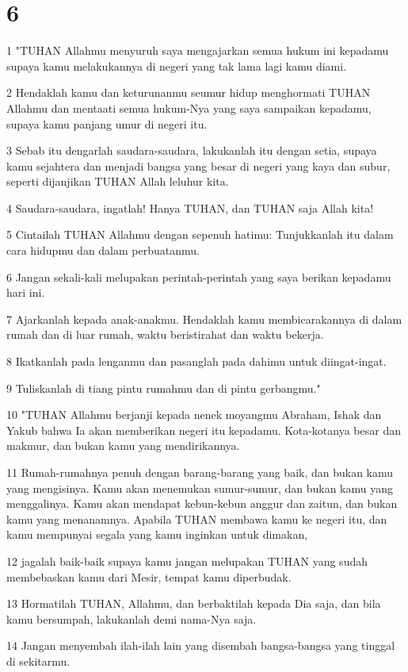 \chapter{6}

\par 1 "TUHAN Allahmu menyuruh saya mengajarkan semua hukum ini kepadamu supaya kamu melakukannya di negeri yang tak lama lagi kamu diami.
\par 2 Hendaklah kamu dan keturunanmu seumur hidup menghormati TUHAN Allahmu dan mentaati semua hukum-Nya yang saya sampaikan kepadamu, supaya kamu panjang umur di negeri itu.
\par 3 Sebab itu dengarlah saudara-saudara, lakukanlah itu dengan setia, supaya kamu sejahtera dan menjadi bangsa yang besar di negeri yang kaya dan subur, seperti dijanjikan TUHAN Allah leluhur kita.
\par 4 Saudara-saudara, ingatlah! Hanya TUHAN, dan TUHAN saja Allah kita!
\par 5 Cintailah TUHAN Allahmu dengan sepenuh hatimu: Tunjukkanlah itu dalam cara hidupmu dan dalam perbuatanmu.
\par 6 Jangan sekali-kali melupakan perintah-perintah yang saya berikan kepadamu hari ini.
\par 7 Ajarkanlah kepada anak-anakmu. Hendaklah kamu membicarakannya di dalam rumah dan di luar rumah, waktu beristirahat dan waktu bekerja.
\par 8 Ikatkanlah pada lenganmu dan pasanglah pada dahimu untuk diingat-ingat.
\par 9 Tuliskanlah di tiang pintu rumahmu dan di pintu gerbangmu."
\par 10 "TUHAN Allahmu berjanji kepada nenek moyangmu Abraham, Ishak dan Yakub bahwa Ia akan memberikan negeri itu kepadamu. Kota-kotanya besar dan makmur, dan bukan kamu yang mendirikannya.
\par 11 Rumah-rumahnya penuh dengan barang-barang yang baik, dan bukan kamu yang mengisinya. Kamu akan menemukan sumur-sumur, dan bukan kamu yang menggalinya. Kamu akan mendapat kebun-kebun anggur dan zaitun, dan bukan kamu yang menanamnya. Apabila TUHAN membawa kamu ke negeri itu, dan kamu mempunyai segala yang kamu inginkan untuk dimakan,
\par 12 jagalah baik-baik supaya kamu jangan melupakan TUHAN yang sudah membebaskan kamu dari Mesir, tempat kamu diperbudak.
\par 13 Hormatilah TUHAN, Allahmu, dan berbaktilah kepada Dia saja, dan bila kamu bersumpah, lakukanlah demi nama-Nya saja.
\par 14 Jangan menyembah ilah-ilah lain yang disembah bangsa-bangsa yang tinggal di sekitarmu.
